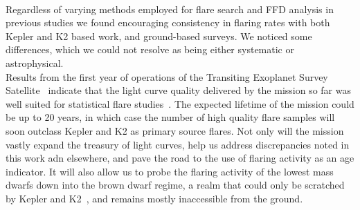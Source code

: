 \documentclass{aa}
\begin{document}
\\
Regardless of varying methods employed for flare search and FFD analysis in previous studies we found encouraging consistency in flaring rates with both Kepler and K2 based work, and ground-based surveys. We noticed some differences, which we could not resolve as being either systematic or astrophysical.
\\
Results from the first year of operations of the Transiting Exoplanet Survey Satellite~\citep{ricker2014} indicate that the light curve quality delivered by the mission so far was well suited for statistical flare studies~\citep{doyle2020,guenther2020}. The expected lifetime of the mission could be up to 20 years, in which case the number of high quality flare samples will soon outclass Kepler and K2 as primary source flares. Not only will the mission vastly expand the treasury of light curves, help us address discrepancies noted in this work adn elsewhere, and pave the road to the use of flaring activity as an age indicator. It will also allow us to probe the flaring activity of the lowest mass dwarfs down into the brown dwarf regime, a realm that could only be scratched by Kepler and K2~\citep{gizis2013, paudel2018}, and remains mostly inaccessible from the ground.
\end{document}
